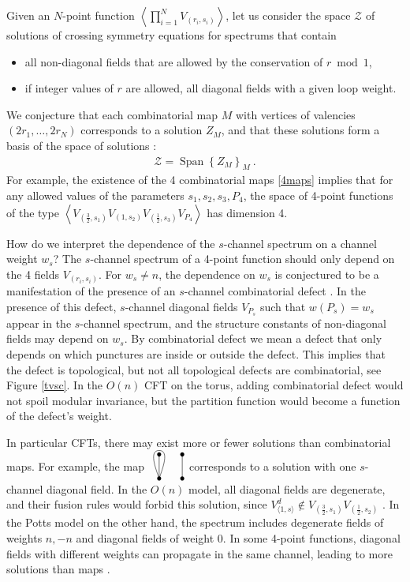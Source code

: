 \documentclass[12pt, a4paper]{article}
\newcommand{\vertices}{
\coordinate (base) at (0, 1);
\draw (0, 0) node[fill, circle, minimum size = 1.3mm, inner sep = 0]{};
  \draw (3, 0) node[fill, circle, minimum size = 1.3mm, inner sep = 0]{};
  \draw (0, 3) node[fill, circle, minimum size = 1.3mm, inner sep = 0]{};
  \draw (3, 3) node[fill, circle, minimum size = 1.3mm, inner sep = 0]{};
}
\theoremstyle{break}
\begin{document}
Given an $N$-point function $\left<\prod_{i=1}^N V_{(r_i,s_i)}\right>$, let us consider the space $\mathcal{Z}$ of solutions of crossing symmetry equations for spectrums that contain
\begin{itemize}
 \item all non-diagonal fields that are allowed by the conservation of $r\bmod 1$,
 \item if integer values of $r$ are allowed, all diagonal fields with a given loop weight. 
\end{itemize}
We conjecture that each combinatorial map $M$ with vertices of valencies $(2r_1,\dots, 2r_N)$ corresponds to a solution $Z_M$, and that these solutions form a basis of the space of solutions \cite{gjnrs23}:
\begin{align}
 \mathcal{Z} = \operatorname{Span}\left\{ Z_M\right\}_{M}\  .
\end{align}
For example, the existence of the 4 combinatorial maps
\eqref{4maps} implies that for any allowed values of the parameters $s_1,s_2,s_3,P_4$, the space of 4-point functions of the type $\left<V_{(\frac32,s_1)}V_{(1,s_2)}V_{(\frac12,s_3)}V_{P_4}\right>$ has dimension 4. 

How do we interpret the dependence of the $s$-channel spectrum on a channel weight $w_s$? The $s$-channel spectrum of a 4-point function should only depend on the 4 fields $V_{(r_i,s_i)}$. For $w_s\neq n$, the dependence on $w_s$ is conjectured to be a manifestation of the presence of an $s$-channel combinatorial defect \cite{rib22}. In the presence of this defect, $s$-channel diagonal fields $V_{P_s}$ such that $w(P_s)=w_s$ appear in the $s$-channel spectrum, and the structure constants of non-diagonal fields may depend on $w_s$. By combinatorial defect we mean a defect that only depends on which punctures are inside or outside the defect. This implies that the defect is topological, but not all topological defects are combinatorial, see Figure \eqref{tvsc}. In the $O(n)$ CFT on the torus, adding combinatorial defect would not spoil modular invariance, but the partition function would become a function of the defect's weight. 

In particular CFTs, there may exist more or fewer solutions than combinatorial maps. 
For example, the map 
$
\begin{tikzpicture}[baseline=(base), scale = .25]
 \vertices
  \draw (0, 0) -- (0, 3);
  \draw (3, 0) -- (3, 3);
  \draw (0, 0) to [out = 70, in = 0] (0, 3.5) to [out = 180, in = 110] (0, 0);
 \end{tikzpicture}
 $
corresponds to a solution with one $s$-channel diagonal field.
 In the $O(n)$ model, all diagonal fields are degenerate, and their fusion rules would forbid this solution, since $V^d_{\langle 1,s\rangle}\notin V_{(\frac32,s_1)}V_{(\frac12,s_2)}$ \cite{gnjrs21}. In the Potts model on the other hand, the spectrum includes degenerate fields of weights $n,-n$ and diagonal fields of weight $0$. In some 4-point functions, diagonal fields with different weights can propagate in the same channel, leading to more solutions than maps \cite{niv22}. 
 
\end{document}
